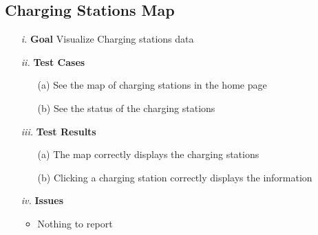 \documentclass[table, 12pt]{article}
\begin{document}
\subsection{Charging Stations Map}
\begin{itemize}
    \item[\textit{i.}] \textbf{Goal} Visualize Charging stations data
    \item[\textit{ii.}] \textbf{Test Cases}
    \begin{itemize}
        \item[(a)] See the map of charging stations in the home page
        \item[(b)] See the status of the charging stations
    \end{itemize}
    \item[\textit{iii.}] \textbf{Test Results}
    \begin{itemize}
        \item[(a)] The map correctly displays the charging stations
        \item[(b)] Clicking a charging station correctly displays the information
    \end{itemize} 
    \item[\textit{iv.}] \textbf{Issues}    
    \begin{itemize}
        \item Nothing to report
    \end{itemize} 
\end{itemize}
\end{document}
